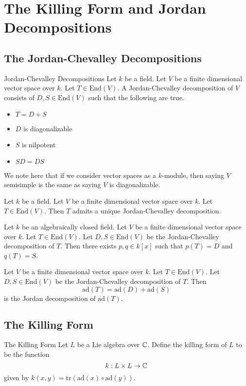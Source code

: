 \documentclass[a4paper]{article}
\begin{document}
\pagebreak
\section{The Killing Form and Jordan Decompositions}
\subsection{The Jordan-Chevalley Decompositions}
\begin{defn}{Jordan-Chevalley Decompositions}{} Let $k$ be a field. Let $V$ be a finite dimensional vector space over $k$. Let $T\in\text{End}(V)$. A Jordan-Chevalley decomposition of $V$ consists of $D,S\in\text{End}(V)$ such that the following are true. 
\begin{itemize}
\item $T=D+S$
\item $D$ is diagonalizable
\item $S$ is nilpotent
\item $SD=DS$
\end{itemize}
\end{defn}

We note here that if we consider vector spaces as a $k$-module, then saying $V$ semisimple is the same as saying $V$ is diagonalizable. 

\begin{prp}{}{} Let $k$ be a field. Let $V$ be a finite dimensional vector space over $k$. Let $T\in\text{End}(V)$. Then $T$ admits a unique Jordan-Chevalley decomposition. 
\end{prp}

\begin{prp}{}{} Let $k$ be an algebraically closed field. Let $V$ be a finite dimensional vector space over $k$. Let $T\in\text{End}(V)$. Let $D,S\in\text{End}(V)$ be the Jordan-Chevalley decomposition of $T$. Then there exists $p,q\in k[x]$ such that $p(T)=D$ and $q(T)=S$. 
\end{prp}

\begin{lmm}{}{} Let $V$ be a finite dimensional vector space over $k$. Let $T\in\text{End}(V)$. Let $D,S\in\text{End}(V)$ be the Jordan-Chevalley decomposition of $T$. Then $$\text{ad}(T)=\text{ad}(D)+\text{ad}(S)$$ is the Jordan decomposition of $\text{ad}(T)$. 
\end{lmm}

\subsection{The Killing Form}
\begin{defn}{The Killing Form}{} Let $L$ be a Lie algebra over $\mathbb{C}$. Define the killing form of $L$ to be the function $$k:L\times L\to\mathbb{C}$$ given by $k(x,y)=\text{tr}(\text{ad}(x)\circ\text{ad}(y))$. 
\end{defn}
\end{document}
